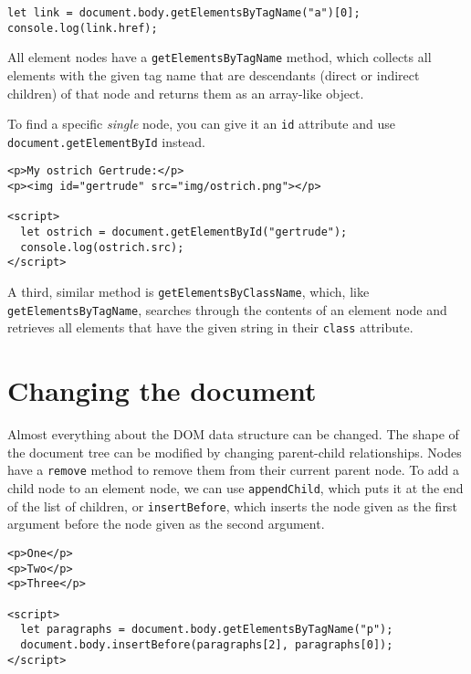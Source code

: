 \begin{lstlisting}
let link = document.body.getElementsByTagName("a")[0];
console.log(link.href);
\end{lstlisting}
\noindent{}

All element nodes have a \lstinline`getElementsByTagName` method, which collects all elements with the given tag name that are descendants (direct or indirect children) of that node and returns them as an array-like
object.

To find a specific \emph{single} node, you can give it an \lstinline`id` attribute and use \lstinline`document.getElementById` instead.

\begin{lstlisting}
<p>My ostrich Gertrude:</p>
<p><img id="gertrude" src="img/ostrich.png"></p>

<script>
  let ostrich = document.getElementById("gertrude");
  console.log(ostrich.src);
</script>
\end{lstlisting}
\noindent{}

A third, similar method is \lstinline`getElementsByClassName`, which, like \lstinline`getElementsByTagName`, searches through the contents of an element node and retrieves all elements that have the given string in their \lstinline`class` attribute.

\section{Changing the document}

Almost everything about the DOM data structure can be changed. The shape of the document tree can be modified by changing parent-child relationships. Nodes have a \lstinline`remove` method to remove them from their current parent node. To add a child node to an element node, we can use \lstinline`appendChild`, which puts it at the end of the list of children, or \lstinline`insertBefore`, which inserts the node given as the first argument before the node given as the second argument.

\begin{lstlisting}
<p>One</p>
<p>Two</p>
<p>Three</p>

<script>
  let paragraphs = document.body.getElementsByTagName("p");
  document.body.insertBefore(paragraphs[2], paragraphs[0]);
</script>
\end{lstlisting}
\noindent

